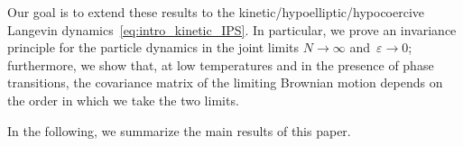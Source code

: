 \documentclass[onefignum,onetabnum]{siamart251216} %
\newcommand{\tcr}[1]{\textcolor{red}{#1}}
\newcommand{\eps}{\varepsilon}
\theoremstyle{plain}
\numberwithin{equation}{section}
\numberwithin{theorem}{section}
\begin{document}
Our goal is to extend these results to the kinetic/hypoelliptic/hypocoercive Langevin dynamics~\eqref{eq:intro_kinetic_IPS}. In particular, we prove an invariance principle for the particle dynamics in the joint limits $N \to \infty$ and~$\eps \to 0$; furthermore, we show that, at low temperatures and in the presence of phase transitions, the covariance matrix of the limiting Brownian motion depends on the order in which we take the two limits.

In the following, we summarize the main results of this paper.


\smallskip
\end{document}
